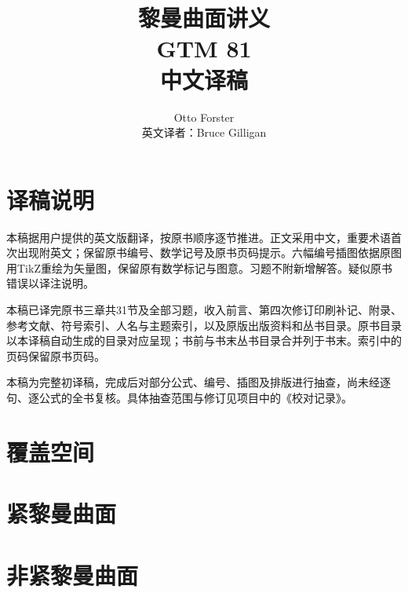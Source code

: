 \documentclass[UTF8,11pt,openany]{ctexbook}
\title{黎曼曲面讲义\\GTM 81\\中文译稿}
\author{Otto Forster\\英文译者：Bruce Gilligan}
\date{}
\begin{document}
\frontmatter
\maketitle
\chapter*{译稿说明}
本稿据用户提供的英文版翻译，按原书顺序逐节推进。正文采用中文，重要术语首次出现附英文；保留原书编号、数学记号及原书页码提示。六幅编号插图依据原图用TikZ重绘为矢量图，保留原有数学标记与图意。习题不附新增解答。疑似原书错误以译注说明。

本稿已译完原书三章共31节及全部习题，收入前言、第四次修订印刷补记、附录、参考文献、符号索引、人名与主题索引，以及原版出版资料和丛书目录。原书目录以本译稿自动生成的目录对应呈现；书前与书末丛书目录合并列于书末。索引中的页码保留原书页码。

本稿为完整初译稿，完成后对部分公式、编号、插图及排版进行抽查，尚未经逐句、逐公式的全书复核。具体抽查范围与修订见项目中的《校对记录》。

\tableofcontents

\mainmatter
\chapter{覆盖空间}












\chapter{紧黎曼曲面}











\chapter{非紧黎曼曲面}











\backmatter





\end{document}
